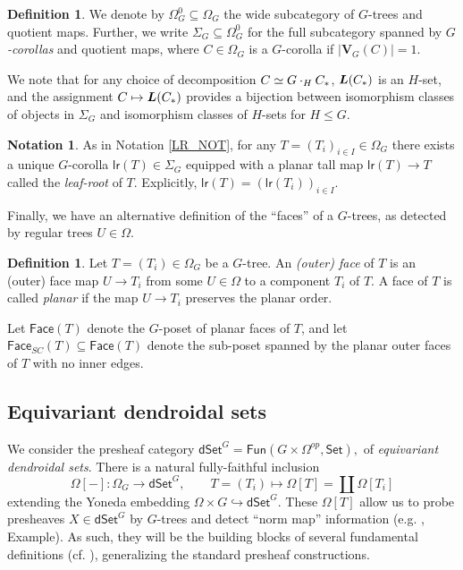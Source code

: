 \documentclass[a4paper,10pt
,draft
]{article}%
\numberwithin{equation}{section}
\numberwithin{figure}{section}
\theoremstyle{definition} %
\newtheorem{definition}[equation]{Definition}%
\newtheorem{notation}[equation]{Notation}%
\newcommand{\longto}{\longrightarrow}%
\newcommand{\into}{\hookrightarrow}%
\newcommand{\Set}{\ensuremath{\mathsf{Set}}}
\newcommand{\dSet}{\mathsf{dSet}}
\newcommand{\Fun}{\mathsf{Fun}}
\newcommand{\1}{\ensuremath{\mathbbm 1}}%
\begin{document}
\begin{definition}
      We denote by $\Omega_G^0 \subseteq \Omega_G$ the wide subcategory of $G$-trees and quotient maps.
      Further, we write $\Sigma_G \subseteq \Omega_G^0$ for the full subcategory spanned by \textit{$G$-corollas} and quotient maps,
      where $C \in \Omega_G$ is a $G$-corolla if $|\boldsymbol{V}_G(C)| = 1$.

      We note that for any choice of decomposition $C \simeq G \cdot_H C_{\**}$, $\boldsymbol{L}(C_{\**})$ is an $H$-set,
      and the assignment $C \mapsto \boldsymbol{L}(C_{\**})$ provides a bijection between
      isomorphism classes of objects in $\Sigma_G$ and
      isomorphism classes of $H$-sets for $H \leq G$.
\end{definition}
      
\begin{notation}
      \label{LRG_NOT}
      As in Notation \ref{LR_NOT}, 
      for any $T = (T_i)_{i \in I} \in \Omega_G$ there exists a unique $G$-corolla $\mathsf{lr}(T) \in \Sigma_G$ equipped with a planar tall map $\mathsf{lr}(T) \to T$
      called the \textit{leaf-root} of $T$.
      Explicitly, $\mathsf{lr}(T) = (\mathsf{lr}(T_i))_{i \in I}$.
\end{notation}

Finally, we have an alternative definition of the ``faces'' of a $G$-trees, as detected by regular trees $U \in \Omega$.
\begin{definition}
      Let $T = (T_i) \in \Omega_G$ be a $G$-tree.
      An \textit{(outer) face} of $T$ is an (outer) face map $U \to T_i$ from some $U \in \Omega$ to a component $T_i$ of $T$.
      A face of $T$ is called \textit{planar} if the map $U \to T_i$ preserves the planar order.

      Let $\mathsf{Face}(T)$ denote the $G$-poset of planar faces of $T$,
      and let $\mathsf{Face}_{SC}(T) \subseteq \mathsf{Face}(T)$ denote the sub-poset spanned by the planar outer faces of $T$ with no inner edges.
\end{definition}



\subsection{Equivariant dendroidal sets}
\label{EDS_SEC}

We consider the presheaf category 
$
\dSet^G = \Fun(G \times \Omega^{op}, \Set),
$
of \textit{equivariant dendroidal sets}.
There is a natural fully-faithful inclusion
\[
      \Omega[-] \colon \Omega_G \longto \dSet^G,
      \qquad
      T = (T_i) \longmapsto \Omega[T] = \coprod \Omega[T_i]
\]
extending the Yoneda embedding $\Omega \times G \into \dSet^G$.
These $\Omega[T]$ allow us to probe presheaves $X \in \dSet^G$ by $G$-trees and detect ``norm map'' information 
(e.g. \cite[Example 4.9]{Per18}, {\color{blue} Example}).
As such, they will be the building blocks of several fundamental definitions (cf. \cite[\S 6]{Per18}), generalizing the standard presheaf constructions.
\end{document}
